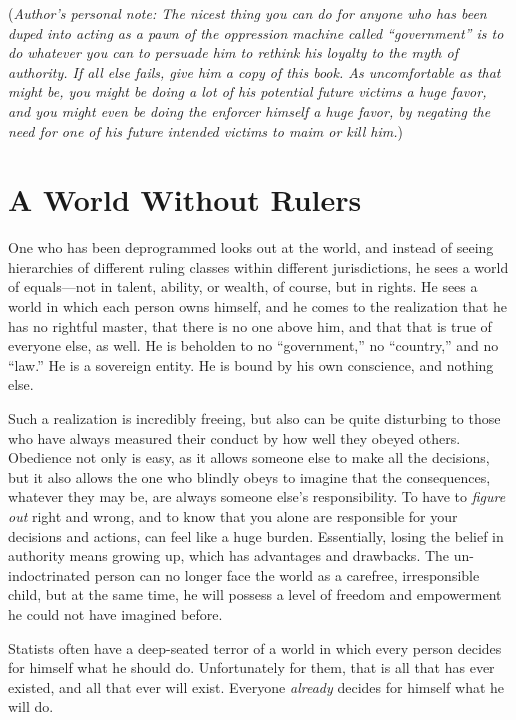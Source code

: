 \documentclass{book}
\begin{document}
(\emph{Author's personal note: The nicest thing you can do for anyone who has been duped into acting as a pawn of the oppression machine called \enquote{government} is to do whatever you can to persuade him to rethink his loyalty to the myth of authority. If all else fails, give him a copy of this book. As uncomfortable as that might be, you might be doing a lot of his potential future victims a huge favor, and you might even be doing the enforcer himself a huge favor, by negating the need for one of his future intended victims to maim or kill him.})

\section{A World Without Rulers}

One who has been deprogrammed looks out at the world, and instead of seeing hierarchies of different ruling classes within different jurisdictions, he sees a world of equals---not in talent, ability, or wealth, of course, but in rights. He sees a world in which each person owns himself, and he comes to the realization that he has no rightful master, that there is no one above him, and that that is true of everyone else, as well. He is beholden to no \enquote{government,} no \enquote{country,} and no \enquote{law.} He is a sovereign entity. He is bound by his own conscience, and nothing else.

Such a realization is incredibly freeing, but also can be quite disturbing to those who have always measured their conduct by how well they obeyed others. Obedience not only is easy, as it allows someone else to make all the decisions, but it also allows the one who blindly obeys to imagine that the consequences, whatever they may be, are always someone else's responsibility. To have to \emph{figure out} right and wrong, and to know that you alone are responsible for your decisions and actions, can feel like a huge burden. Essentially, losing the belief in authority means growing up, which has advantages and drawbacks. The un-indoctrinated person can no longer face the world as a carefree, irresponsible child, but at the same time, he will possess a level of freedom and empowerment he could not have imagined before.

Statists often have a deep-seated terror of a world in which every person decides for himself what he should do. Unfortunately for them, that is all that has ever existed, and all that ever will exist. Everyone \emph{already} decides for himself what he will do.
\end{document}
